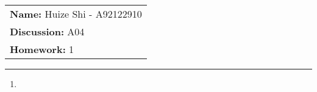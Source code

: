 \documentclass[12pt]{article}
\begin{document}
\null\hfill\begin{tabular}[t]{l@{}}
	\textbf{Name: }Huize Shi - A92122910 \\
	\textbf{Discussion: }A04 \\
	\textbf{Homework: }1
\end{tabular}
\noindent\rule{\textwidth}{0.5pt}

\begin{enumerate}
	\item
\end{enumerate}
\end{document}
